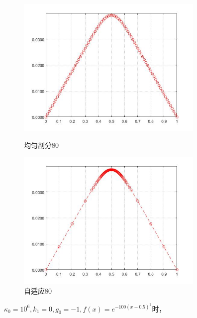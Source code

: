 \documentclass[12pt]{ctexart}
\begin{document}
\begin{figure}[H]
	\centering
	\begin{minipage}[t]{0.48\textwidth}
		\centering
		\includegraphics[width=9cm]{方程二，均匀剖分80.jpg}
		\caption{均匀剖分80}
	\end{minipage}
	\begin{minipage}[t]{0.48\textwidth}
		\centering
		\includegraphics[width=9cm]{方程二，自适应80.jpg}
		\caption{自适应80}
	\end{minipage}
\end{figure}
$\kappa_0=10^6,k_1=0,g_0=-1,f(x)=e^{-100(x-0.5)^2}$时，\\
\end{document}
